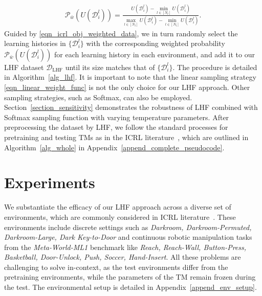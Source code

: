 \documentclass{article}
\def\ccalD{{\ensuremath{\mathcal D}}}
\begin{document}
\begin{align}\label{eqn_linear_weight_func}
    \mathcal{P}_{\bar{w}}(U(\ccalD_i^l)) = \frac{U(\ccalD_i^l) - \min_{l \in [N_l]} U(\ccalD_i^l)}{\max_{l \in [N_l]} U(\ccalD_i^l) - \min_{l \in [N_l]} U(\ccalD_i^l)}.
\end{align}
Guided by \eqref{eqn_icrl_obj_weighted_data}, we in turn randomly select the learning histories in $\{\ccalD_i^l\}$ with the corresponding weighted probability $\mathcal{P}_{\bar{w}}(U(\ccalD_i^l))$ for each learning history in each environment, and add it to our LHF dataset $\ccalD_\text{LHF}$ until its size matches that of $\{\ccalD_i^l\}$. The procedure is detailed in Algorithm~\ref{alg_lhf}.
It is important to note that the linear sampling strategy \eqref{eqn_linear_weight_func} is not the only choice for our LHF approach. Other sampling strategies, such as Softmax, can also be employed. Section~\ref{section_sensitivity} demonstrates the robustness of LHF combined with Softmax sampling function with varying temperature parameters.
After preprocessing the dataset by LHF, we follow the standard processes for pretraining and testing TMs as in the ICRL literature~\cite{laskin2022context, lee2024supervised, chen2025random}, which are outlined in Algorithm~\ref{alg_whole} in Appendix~\ref{append_complete_pseudocode}.
\section{Experiments}
\label{section_experiment}
We substantiate the efficacy of our LHF approach across a diverse set of environments, which are commonly considered in ICRL literature~\citep{laskin2022context, lee2024supervised, son2025distilling, chen2025random}.
These environments include discrete settings such as \textit{Darkroom, Darkroom-Permuted, Darkroom-Large, Dark Key-to-Door} and continuous robotic manipulation tasks from the \textit{Meta-World-ML1} benchmark like \textit{Reach, Reach-Wall, Button-Press, Basketball, Door-Unlock, Push, Soccer, Hand-Insert}.
All these problems are challenging to solve in-context, as the test environments differ from the pretraining environments, while the parameters of the TM remain frozen during the test. The environmental setup is detailed in Appendix~\ref{append_env_setup}.
\end{document}
